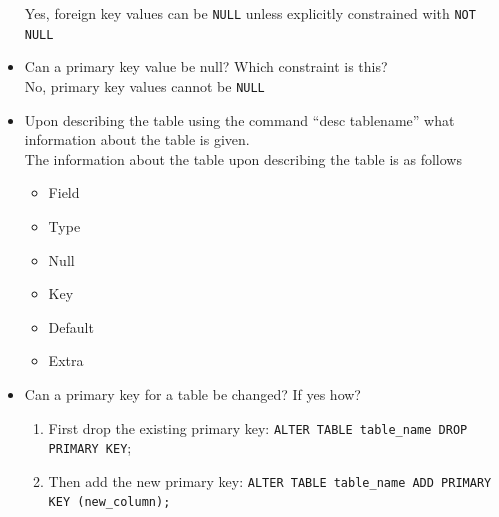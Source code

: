 \documentclass{article}
\begin{document}
\begin{itemize}
Yes, foreign key values can be \texttt{NULL} unless explicitly constrained with \texttt{NOT NULL}
    
    \item Can a primary key value be null? Which constraint is this? \\

No, primary key values cannot be \texttt{NULL}
    
    \item Upon describing the table using the command “desc tablename” what information about the table is given. \\

The information about the table upon describing the table is as follows
\begin{itemize}
    \item Field
    \item Type
    \item Null
    \item Key
    \item Default
    \item Extra
\end{itemize}
    
    \item Can a primary key for a table be changed? If yes how? \\

    \begin{enumerate}
        \item First drop the existing primary key: \texttt{ALTER TABLE table\_name DROP PRIMARY KEY};
        \item Then add the new primary key: \texttt{ALTER TABLE table\_name ADD PRIMARY KEY (new\_column);}
    \end{enumerate}

\end{itemize}




\end{document}
